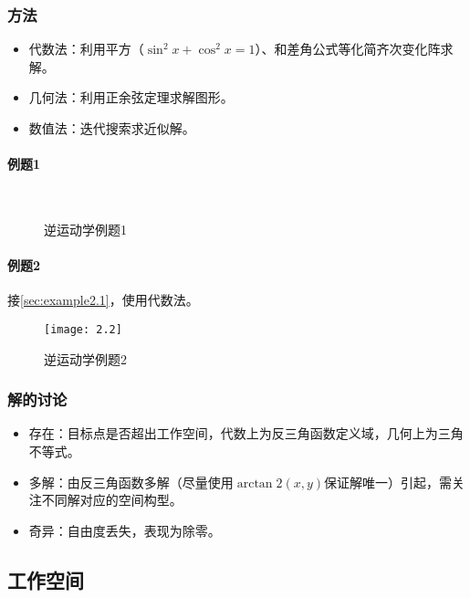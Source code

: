 \documentclass[
12pt, %
a4paper, 
oneside, %
headinclude,footinclude, %
]{scrartcl}
\begin{document}
\subsubsection[方法]{方法}
\begin{itemize}
\item 代数法：利用平方（$ \sin^2x + \cos^2x = 1 $）、和差角公式等化简齐次变化阵求解。
\item 几何法：利用正余弦定理求解图形。
\item 数值法：迭代搜索求近似解。
\end{itemize} 
\paragraph{例题1}
\begin{figure}[H]
\centering
\subfloat[代数法]{\texttt{[image: 3.1]}} \\
\subfloat[几何法]{\texttt{[image: 3.2]}}
\caption[逆运动学例题1]{逆运动学例题1}
\end{figure}
\paragraph{例题2}\label{sec:example2.2}
{\footnotesize
接\ref{sec:example2.1}，使用代数法。
}

\begin{figure}[H]
\centering 
\texttt{[image: 2.2]} 
\caption[逆运动学例题2]{逆运动学例题2}
\end{figure}
\subsubsection[解的讨论]{解的讨论}
\begin{itemize}
\item 存在：目标点是否超出工作空间，代数上为反三角函数定义域，几何上为三角不等式。
\item 多解：由反三角函数多解（尽量使用$ \arctan2(x, y) $保证解唯一）引起，需关注不同解对应的空间构型。
\item 奇异：自由度丢失，表现为除零。
\end{itemize} 
\subsection[工作空间]{工作空间}
\end{document}
